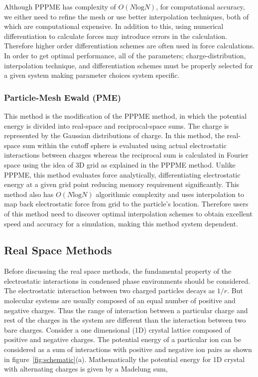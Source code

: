 Although PPPME has complexity of $O(N \mathrm{log}N)$, for computational accuracy, we either need to refine the mesh or use better interpolation techniques, both of which are computational expensive. In addition to this, using numerical differentiation to calculate forces may introduce errors in the calculation. Therefore higher order differentiation schemes are often used in force calculations. In order to get optimal performance, all of the parameters; charge-distribution, interpolation technique, and differentiation schemes must be properly selected for a given system making  parameter choices system specific. \cite{Toukmaji96}

\subsubsection{Particle-Mesh Ewald (PME)}
\label{subsubsec:PME}
This method is the modification of the PPPME method, in which the potential energy is divided into real-space and reciprocal-space sums. The charge is represented by the Gaussian distributions of charge. In this method, the real-space sum within the cutoff sphere is evaluated using actual electrostatic interactions between charges whereas the reciprocal sum is calculated in Fourier space using the idea of 3D grid as explained in the PPPME method. Unlike PPPME, this method evaluates force analytically, differentiating electrostatic energy at a given grid point reducing memory requirement significantly. This method also has $O(N\mathrm{log}N)$ algorithmic complexity and uses interpolation to map back electrostatic force from grid to the particle's location. Therefore users of this method need to discover optimal interpolation schemes to obtain excellent speed and accuracy for a simulation, making this method system dependent.

\subsection{Real Space Methods}
Before discussing the real space methods, the fundamental property of the electrostatic interactions in condensed phase environments should be considered. The electrostatic interaction between two charged particles decays as $1/r$. But molecular systems are usually composed of an equal number of positive and negative charges. Thus the range of interaction between a particular charge and rest of the charges in the system are different than the interaction between two bare charges. Consider a one dimensional (1D) crystal lattice composed of positive and negative charges. The potential energy of a particular ion can be considered as a sum of interactions with positive and negative ion pairs as shown in figure~\ref{fig:schematic}(a). Mathematically the potential energy for 1D crystal with alternating charges is given by a Madelung sum,

